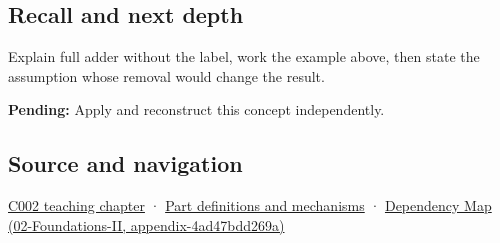 \subsection{Recall and next depth}\label{recall-and-next-depth}

Explain full adder without the label, work the example above, then state the assumption whose removal would change the result.

\textbf{Pending:} Apply and reconstruct this concept independently.

\subsection{Source and navigation}\label{source-and-navigation}

\href{Continuous\%20Notes/Computing\%20Foundations\%20-\%20From\%20Bits\%20to\%20C++\%20and\%20Systems\%20APIs\#Arithmetic\%20becomes\%20a\%20policy}{C002 teaching chapter} · \hyperref[appendix-fd090d982a15]{Part definitions and mechanisms} · \href{}{Dependency Map (02-Foundations-II, appendix-4ad47bdd269a)}
